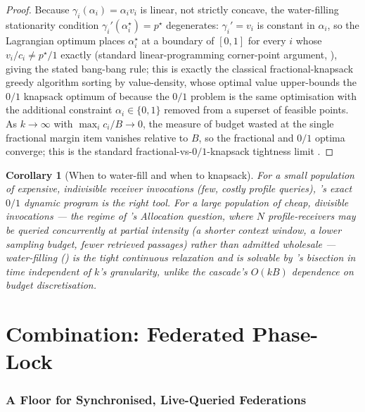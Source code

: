 \documentclass[11pt,twocolumn,a4paper]{article}
\theoremstyle{rdm}
\newtheorem{corollary}[theorem]{Corollary}
\theoremstyle{definition}
\theoremstyle{remark}
\begin{document}
\begin{proof}
Because $\gamma_i(\alpha_i)=\alpha_i v_i$ is linear, not strictly concave,
the water-filling stationarity condition $\gamma_i'(\alpha_i^\star)=p^\star$
degenerates: $\gamma_i'=v_i$ is constant in $\alpha_i$, so the Lagrangian
optimum places $\alpha_i^\star$ at a boundary of $[0,1]$ for every $i$ whose
$v_i/c_i\ne p^\star/1$ exactly (standard linear-programming corner-point
argument, \citealp{boyd2004}), giving the stated bang-bang rule; this is
exactly the classical fractional-knapsack greedy algorithm sorting by
value-density, whose optimal value upper-bounds the $0/1$ knapsack optimum
of  because the $0/1$ problem is the same
optimisation with the additional constraint $\alpha_i\in\{0,1\}$ removed
from a superset of feasible points. As $k\to\infty$ with
$\max_ic_i/B\to0$, the measure of budget wasted at the single fractional
margin item vanishes relative to $B$, so the fractional and $0/1$ optima
converge; this is the standard fractional-vs-$0/1$-knapsack tightness limit
\citep{kellerer2004}.
\end{proof}

\begin{corollary}[When to water-fill and when to knapsack]
\label{cor:when-waterfill}
For a small population of expensive, indivisible receiver invocations
(few, costly profile queries), 's exact $0/1$
dynamic program is the right tool. For a large population of cheap,
divisible invocations — the regime of 's Allocation
question, where $N$ profile-receivers may be queried concurrently at
partial intensity (a shorter context window, a lower sampling budget, fewer
retrieved passages) rather than admitted wholesale — water-filling
() is the tight continuous relaxation and is
solvable by \citet[Alg.~1]{sachikonye-split-attention}'s bisection in time
independent of $k$'s granularity, unlike the cascade's $O(kB)$ dependence on
budget discretisation.
\end{corollary}

\part{Combination: Federated Phase-Lock}
\label{part:combination}

\section{A Floor for Synchronised, Live-Queried Federations}
\label{sec:phaselock}
\end{document}
